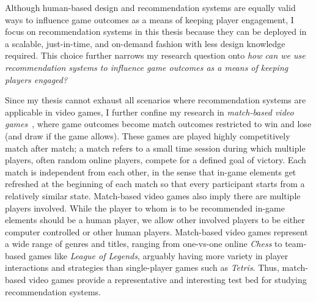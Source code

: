 Although human-based design and recommendation systems are equally valid ways to influence game outcomes as a means of keeping player engagement, I focus on recommendation systems in this thesis because they can be deployed in a scalable, just-in-time, and on-demand fashion with less design knowledge required. This choice further narrows my research question onto \textit{how can we use recommendation systems to influence game outcomes as a means of keeping players engaged?}


Since my thesis cannot exhaust all scenarios where recommendation systems are applicable in video games, I further confine my research in \textit{match-based video games}~\cite{guo2012analysis}, where game outcomes become match outcomes restricted to win and lose (and draw if the game allows). These games are played highly competitively match after match; a match refers to a small time session during which multiple players, often random online players, compete for a defined goal of victory. Each match is independent from each other, in the sense that in-game elements get refreshed at the beginning of each match so that every participant starts from a relatively similar state. Match-based video games also imply there are multiple players involved. While the player to whom is to be recommended in-game elements should be a human player, we allow other involved players to be either computer controlled or other human players. Match-based video games represent a wide range of genres and titles, ranging from one-vs-one online \textit{Chess} to team-based games like \textit{League of Legends}, arguably having more variety in player interactions and strategies than single-player games such as \textit{Tetris}. Thus, match-based video games provide a representative and interesting test bed for studying recommendation systems.

